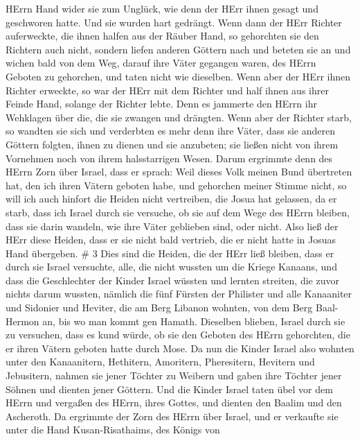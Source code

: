 HErrn Hand wider sie zum Unglück, wie denn der HErr ihnen gesagt und
geschworen hatte. Und sie wurden hart gedrängt.  Wenn dann
der HErr Richter auferweckte, die ihnen halfen aus der Räuber Hand,
 so gehorchten sie den Richtern auch nicht, sondern liefen
anderen Göttern nach und beteten sie an und wichen bald von dem Weg,
darauf ihre Väter gegangen waren, des HErrn Geboten zu gehorchen, und
taten nicht wie dieselben.  Wenn aber der HErr ihnen
Richter erweckte, so war der HErr mit dem Richter und half ihnen aus
ihrer Feinde Hand, solange der Richter lebte. Denn es jammerte den HErrn
ihr Wehklagen über die, die sie zwangen und drängten.  Wenn
aber der Richter starb, so wandten sie sich und verderbten es mehr denn
ihre Väter, dass sie anderen Göttern folgten, ihnen zu dienen und sie
anzubeten; sie ließen nicht von ihrem Vornehmen noch von ihrem
halsstarrigen Wesen.  Darum ergrimmte denn des HErrn Zorn
über Israel, dass er sprach: Weil dieses Volk meinen Bund übertreten
hat, den ich ihren Vätern geboten habe, und gehorchen meiner Stimme
nicht,  so will ich auch hinfort die Heiden nicht
vertreiben, die Josua hat gelassen, da er starb,  dass ich
Israel durch sie versuche, ob sie auf dem Wege des HErrn bleiben, dass
sie darin wandeln, wie ihre Väter geblieben sind, oder nicht.
 Also ließ der HErr diese Heiden, dass er sie nicht bald
vertrieb, die er nicht hatte in Josuas Hand übergeben. \# 3 
Dies sind die Heiden, die der HErr ließ bleiben, dass er durch sie
Israel versuchte, alle, die nicht wussten um die Kriege Kanaans,
 und dass die Geschlechter der Kinder Israel wüssten und
lernten streiten, die zuvor nichts darum wussten,  nämlich
die fünf Fürsten der Philister und alle Kanaaniter und Sidonier und
Heviter, die am Berg Libanon wohnten, von dem Berg Baal-Hermon an, bis
wo man kommt gen Hamath.  Dieselben blieben, Israel durch
sie zu versuchen, dass es kund würde, ob sie den Geboten des HErrn
gehorchten, die er ihren Vätern geboten hatte durch Mose. 
Da nun die Kinder Israel also wohnten unter den Kanaanitern, Hethitern,
Amoritern, Pheresitern, Hevitern und Jebusitern,  nahmen sie
jener Töchter zu Weibern und gaben ihre Töchter jener Söhnen und dienten
jener Göttern.  Und die Kinder Israel taten übel vor dem
HErrn und vergaßen des HErrn, ihres Gottes, und dienten den Baalim und
den Ascheroth.  Da ergrimmte der Zorn des HErrn über Israel,
und er verkaufte sie unter die Hand Kusan-Risathaims, des Königs von
